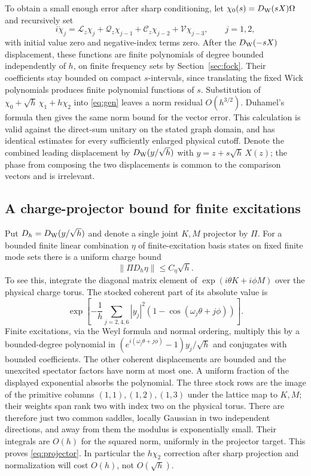 \documentclass[11pt]{article}
\numberwithin{equation}{section}
\begin{document}
To obtain a small enough error after sharp conditioning, let
\(\chi_0(s)=D_{\rm W}(sX)\Omega\) and recursively set
\[
 i\dot\chi_j=\mathcal L_z\chi_j+
     \mathcal Q_z\chi_{j-1}+\mathcal C_z\chi_{j-2}
         +\mathcal V\chi_{j-3}, \qquad j=1,2 ,
\]
with initial value zero and negative-index terms zero.
After the \(D_{\rm W}(-sX)\) displacement, these functions
are finite polynomials of degree bounded independently of \(h\),
on finite frequency sets by Section~\ref{sec:fock}.
Their coefficients stay bounded on compact \(s\)-intervals,
since translating the fixed Wick polynomials produces
finite polynomial functions of \(s\). Substitution of
\(\chi_0+\sqrt h\,\chi_1+h\chi_2\) into \eqref{eq:gen}
leaves a norm residual \(O(h^{3/2})\). Duhamel's formula
then gives the same norm bound for the vector error.
This calculation is valid against the direct-sum
unitary on the stated graph domain, and has identical
estimates for every sufficiently enlarged physical cutoff.
Denote the combined leading displacement by
\(D_{\rm W}(y/\sqrt h)\) with \(y=z+s\sqrt h\,X(z)\);
the phase from composing the two displacements is
common to the comparison vectors and is irrelevant.

\subsection{A charge-projector bound for finite excitations}

Put \(D_h=D_{\rm W}(y/\sqrt h)\) and denote a single joint
\(K,M\) projector by \(\Pi\). For a bounded finite linear
combination \(\eta\) of finite-excitation basis states on
fixed finite mode sets there is a uniform charge bound
\begin{equation}\label{eq:projector}
 \|\Pi D_h\eta\|\le C_\eta\sqrt h .
\end{equation}
To see this, integrate the diagonal matrix element of
\(\exp(i\theta K+i\phi M)\) over the physical charge torus.
The stocked coherent part of its absolute value is
\[
 \exp\!\left[-\frac{1}{h}
  \sum_{j=2,4,6}|y_j|^2(1-\cos(\omega_j\theta+j\phi))\right].
\]
Finite excitations, via the Weyl formula and normal ordering,
multiply this by a bounded-degree polynomial in
\((e^{i(\omega_j\theta+j\phi)}-1)y_j/\sqrt h\) and conjugates
with bounded coefficients. The other coherent displacements
are bounded and the unexcited spectator factors have norm
at most one. A uniform fraction of the displayed exponential
absorbs the polynomial. The three stock rows are the image
of the primitive columns \((1,1),(1,2),(1,3)\) under the
lattice map to \(K,M\); their weights span rank two with
index two on the physical torus. There are therefore just
two common saddles, locally Gaussian in two independent
directions, and away from them the modulus is exponentially
small. Their integrals are \(O(h)\) for the squared norm,
uniformly in the projector target. This proves
\eqref{eq:projector}. In particular the \(h\chi_2\) correction
after sharp projection and normalization will cost \(O(h)\),
not \(O(\sqrt h)\).
\end{document}
